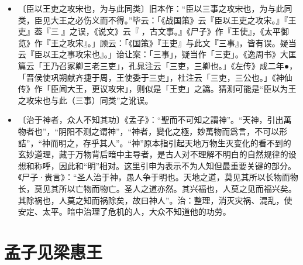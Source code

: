 \documentclass[12pt,UTF-8,openany]{ctexbook}
\begin{document}
\begin{itemize}
    \setlength\itemsep{-0.2em}
    \item〔臣以王吏之攻宋也，为与此同类〕旧本作：“臣以三事之攻宋也，为与此同类，臣见大王之必伤义而不得。”毕云：「《战国策》云『臣以王吏之攻宋。』『王吏』葢『三𠭏』之误，《说文》云『𠭏，古文事。』《尸子》作『王使』，《太平御览》作『王之攻宋』。」顾云：「《国策》『王吏』与此文『三事』，皆有误。疑当云『臣以王之事攻宋也』。」诒让案：「三事」，疑当作「三吏」。《逸周书》大匡篇云「王乃召冢卿三老三吏」，孔晁注云「三吏，三卿也。」《左传》成二年●，「晋侯使巩朔献齐捷于周，王使委于三吏」，杜注云「三吏，三公也。」《神仙传》作「臣闻大王，更议攻宋」，则似是「王吏」之譌。猜测可能是“臣以为王之攻宋也与此（三事）同类”之讹误。
    \item〔治于神者，众人不知其功〕《孟子》：“聖而不可知之謂神”。“天神，引出萬物者也”，“阴阳不测之谓神”，“神者，變化之極，妙萬物而爲言，不可以形詰”，“神而明之，存乎其人”。“神”原本指引起天地万物生灭变化的看不到的玄妙道理，藏于万物背后暗中主导者，是古人对不理解不明白的自然规律的设想和称呼，因此和“明”相对。这里引申为表示不为人知但最重要关键的部分。《尸子·贵言》：“圣人治于神，愚人争于明也。天地之道，莫见其所以长物而物长，莫见其所以亡物而物亡。圣人之道亦然。其兴福也，人莫之见而福兴矣。其除祸也，人莫之知而祸除矣，故曰神人”。治：整理，消灭灾祸、混乱，使安定、太平。暗中治理了危机的人，大众不知道他的功劳。
\end{itemize}

\chapter{孟子见梁惠王}
\end{document}
